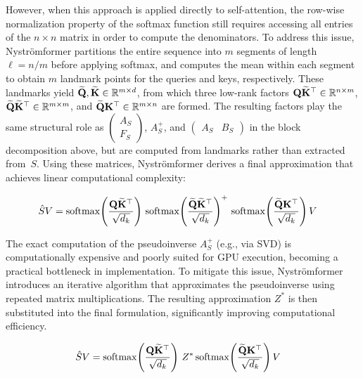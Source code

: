 \documentclass[sigconf,anonymous,review,balance=false]{acmart}
\begin{document}
However, when this approach is applied directly to self-attention, the row-wise normalization property of the softmax function still requires accessing all entries of the $n \times n$ matrix in order to compute the denominators. To address this issue, Nyströmformer partitions the entire sequence into $m$ segments of length $\ell = n/m$ before applying softmax, and computes the mean within each segment to obtain $m$ landmark points for the queries and keys, respectively. These landmarks yield $\widetilde{{\mathbf{Q}}}, \widetilde{{\mathbf{K}}} \in \mathbb{R}^{m \times d}$, from which three low-rank factors ${\mathbf{Q}}\widetilde{{\mathbf{K}}}^\top \in \mathbb{R}^{n \times m}$, $\widetilde{{\mathbf{Q}}}\widetilde{{\mathbf{K}}}^\top \in \mathbb{R}^{m \times m}$, and $\widetilde{{\mathbf{Q}}}{\mathbf{K}}^\top \in \mathbb{R}^{m \times n}$ are formed. The resulting factors play the same structural role as $\begin{pmatrix} A_S \\ F_S \end{pmatrix}$, $A_S^{+}$, and $\begin{pmatrix} A_S & B_S \end{pmatrix}$ in the block decomposition above, but are computed from landmarks rather than extracted from~$S$.
Using these matrices, Nyströmformer derives a final approximation that achieves linear computational complexity:

\begin{align*}
\hat S V &=
{\mathrm{softmax}}\!\left(\frac{{\mathbf{Q}}\widetilde{{\mathbf{K}}}^{\top}}{\sqrt{d_k}}\right)
\,
{\mathrm{softmax}}\!\left(\frac{\widetilde{{\mathbf{Q}}}\widetilde{{\mathbf{K}}}^{\top}}{\sqrt{d_k}}\right)^{+}
\,
{\mathrm{softmax}}\!\left(\frac{\widetilde{{\mathbf{Q}}}{\mathbf{K}}^{\top}}{\sqrt{d_k}}\right)V
\end{align*}

The exact computation of the pseudoinverse $A_S^{+}$ (e.g., via SVD) is computationally expensive and poorly suited for GPU execution, becoming a practical bottleneck in implementation. To mitigate this issue, Nyströmformer introduces an iterative algorithm that approximates the pseudoinverse using repeated matrix multiplications. The resulting approximation $Z^*$ is then substituted into the final formulation, significantly improving computational efficiency.

\begin{align*}
\hat S V &= {\mathrm{softmax}}\!\left(\frac{{\mathbf{Q}}\widetilde{{\mathbf{K}}}^{\top}}{\sqrt{d_k}}\right)\, Z^* \,
{\mathrm{softmax}}\!\left(\frac{\widetilde{{\mathbf{Q}}}{\mathbf{K}}^{\top}}{\sqrt{d_k}}\right)V
\end{align*}
\end{document}
